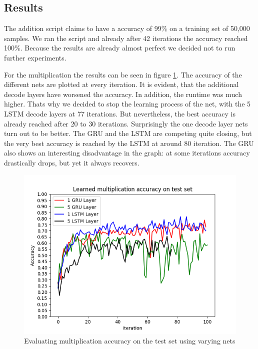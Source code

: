 \documentclass{article}[]
\begin{document}
\subsection{Results}
The addition script claims to have a accuracy of 99\% on a training set of 50,000 samples.
We ran the script and already after 42 iterations the accuracy reached 100\%.
Because the results are already almost perfect we decided not to run further experiments.


For the multiplication the results can be seen in figure \ref{fig:multiply}.
The accuracy of the different nets are plotted at every iteration.
It is evident, that the additional decode layers have worsened the accuracy.
In addition, the runtime was much higher.
Thats why we decided to stop the learning process of the net, with the 5 LSTM decode layers at 77 iterations.
But nevertheless, the best accuracy is already reached after 20 to 30 iterations.
Surprisingly the one decode layer nets turn out to be better.
The GRU and the LSTM are competing quite closing, but the very best accuracy is reached by the LSTM at around 80 iteration.
The GRU also shows an interesting disadvantage in the graph: at some iterations accuracy drastically drops, but yet it always recovers.

\begin{figure}[H]
\centering
\includegraphics[width=1\linewidth]{img/multiply}
\caption{Evaluating multiplication accuracy on the test set using varying nets}
\label{fig:multiply}
\end{figure}
\end{document}
